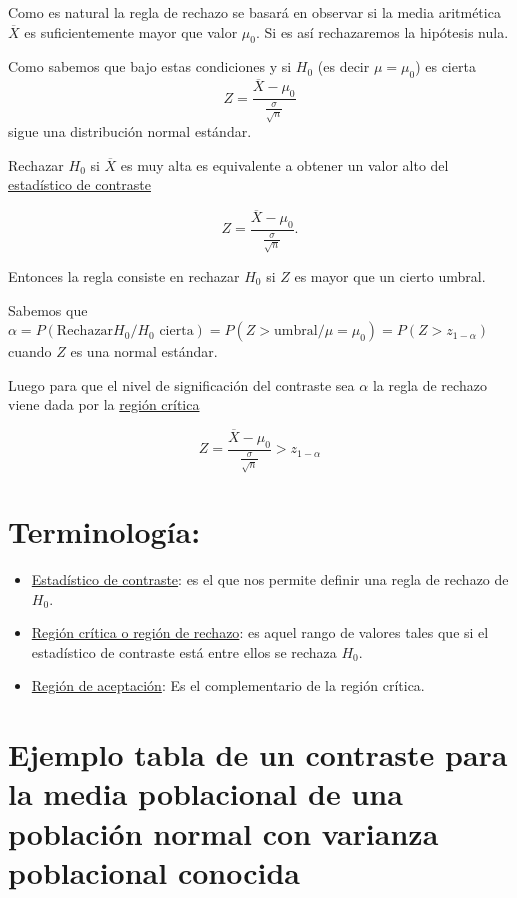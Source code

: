 \documentclass[12pt]{report}
\begin{document}
    Como es natural la regla de rechazo se basará en observar si la
    media aritmética $\overline{X}$ es suficientemente mayor que
    valor $\mu_{0}$. Si es así rechazaremos la hipótesis nula.

    Como sabemos que bajo estas condiciones y si $H_{0}$ (es decir
    $\mu=\mu_{0}$) es cierta
    $$Z=\frac{\overline{X}-\mu_{0}}{\frac{\sigma}{\sqrt{n}}}$$
    sigue una distribución normal estándar.

%
%


    Rechazar $H_{0}$ si $\overline{X}$ es muy alta es equivalente
    a obtener un valor alto del \underline{estadístico de contraste}

    $$Z=\frac{\overline{X}-\mu_{0}}{\frac{\sigma}{\sqrt{n}}}.$$


    Entonces  la regla consiste en rechazar $H_{0}$ si $Z$ es mayor que un
    cierto umbral.

    Sabemos que $\alpha=P(\mbox{Rechazar} H_{0}/ H_{0} \mbox{ cierta})=
    P(Z>\mbox{umbral}/\mu=\mu_{0})= P(Z>z_{1-\alpha})$
    cuando $Z$ es una normal estándar.

    Luego para que el nivel de significación del contraste sea $\alpha$
    la regla de
    rechazo viene dada por la \underline{región crítica}

     $$Z=\frac{\overline{X}-\mu_{0}}{\frac{\sigma}{\sqrt{n}}}>z_{1-\alpha}$$
%  
%
%  
\section{Terminología:} 
\begin{itemize}
\item \underline{Estadístico de contraste}: es el
que nos permite definir una regla de rechazo de $H_{0}$. 
\item \underline{Región crítica o región
de rechazo}:
es aquel rango de valores tales que si el estadístico de contraste
está entre ellos se rechaza $H_{0}$.
\item \underline{Región de aceptación}: Es el complementario de la región
  crítica.
  \end{itemize}



    \section{Ejemplo tabla de un contraste para la media poblacional de una población
    normal con varianza poblacional conocida}
\end{document}
